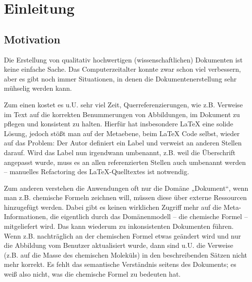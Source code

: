 \newcommand{\scaltex}{Scaltex's Latex Projection}
 
 
\chapter{Einleitung}\label{}
 
\section{Motivation}\label{}
 
Die Erstellung von qualitativ hochwertigen (wissenschaftlichen) Dokumenten ist keine einfache Sache. Das Computerzeitalter konnte zwar schon viel verbessern, aber es gibt noch immer Situationen, in denen die Dokumentenerstellung sehr mühselig werden kann.

 
Zum einen kostet es u.U. sehr viel Zeit, Querreferenzierungen, wie z.B. Verweise im Text auf die korrekten Benummerungen von Abbildungen, im Dokument zu pflegen und konsistent zu halten. Hierfür hat insbesondere LaTeX eine solide Lösung, jedoch stößt man auf der Metaebene, beim LaTeX Code selbst, wieder auf das Problem: Der Autor definiert ein Label und verweist an anderen Stellen darauf. Wird das Label nun irgendwann umbenannt, z.B. weil die Überschrift angepasst wurde, muss es an allen referenzierten Stellen auch umbenannt werden -- manuelles Refactoring des LaTeX-Quelltextes ist notwendig.

 
Zum anderen verstehen die Anwendungen oft nur die Domäne „Dokument“, wenn man z.B. chemische Formeln zeichnen will, müssen diese über externe Ressourcen hinzugefügt werden. Dabei gibt es keinen wirklichen Zugriff mehr auf die Meta-Informationen, die eigentlich durch das Domänenmodell -- die chemische Formel -- mitgeliefert wird. Das kann wiederum zu inkonsistenten Dokumenten führen. Wenn z.B. nachträglich an der chemischen Formel etwas geändert wird und nur die Abbildung vom Benutzer aktualisiert wurde, dann sind u.U. die Verweise (z.B. auf die Masse des chemischen Moleküls) in den beschreibenden Sätzen nicht mehr korrekt. Es fehlt das semantische Verständnis seitens des Dokuments; es weiß also nicht, was die chemische Formel zu bedeuten hat.

